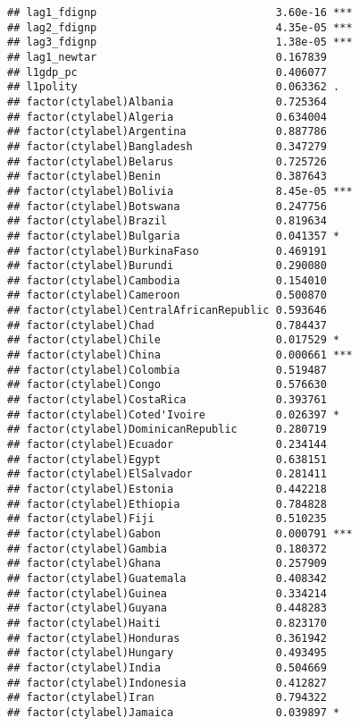 \documentclass[12pt]{article}\usepackage[]{graphicx}\usepackage[]{color}
\makeatletter
\newenvironment{kframe}{%
 \def\at@end@of@kframe{}%
 \ifinner\ifhmode%
  \def\at@end@of@kframe{\end{minipage}}%
  \begin{minipage}{\columnwidth}%
 \fi\fi%
 \def\FrameCommand##1{\hskip\@totalleftmargin \hskip-\fboxsep
 \colorbox{shadecolor}{##1}\hskip-\fboxsep
     \hskip-\linewidth \hskip-\@totalleftmargin \hskip\columnwidth}%
 \MakeFramed {\advance\hsize-\width
   \@totalleftmargin\z@ \linewidth\hsize
   \@setminipage}}%
 {\par\unskip\endMakeFramed%
 \at@end@of@kframe}
\newenvironment{knitrout}{}{} %
\makeatother
\begin{document}
\begin{knitrout}
\begin{kframe}
\begin{verbatim}
## lag1_fdignp                            3.60e-16 ***
## lag2_fdignp                            4.35e-05 ***
## lag3_fdignp                            1.38e-05 ***
## lag1_newtar                            0.167839    
## l1gdp_pc                               0.406077    
## l1polity                               0.063362 .  
## factor(ctylabel)Albania                0.725364    
## factor(ctylabel)Algeria                0.634004    
## factor(ctylabel)Argentina              0.887786    
## factor(ctylabel)Bangladesh             0.347279    
## factor(ctylabel)Belarus                0.725726    
## factor(ctylabel)Benin                  0.387643    
## factor(ctylabel)Bolivia                8.45e-05 ***
## factor(ctylabel)Botswana               0.247756    
## factor(ctylabel)Brazil                 0.819634    
## factor(ctylabel)Bulgaria               0.041357 *  
## factor(ctylabel)BurkinaFaso            0.469191    
## factor(ctylabel)Burundi                0.290080    
## factor(ctylabel)Cambodia               0.154010    
## factor(ctylabel)Cameroon               0.500870    
## factor(ctylabel)CentralAfricanRepublic 0.593646    
## factor(ctylabel)Chad                   0.784437    
## factor(ctylabel)Chile                  0.017529 *  
## factor(ctylabel)China                  0.000661 ***
## factor(ctylabel)Colombia               0.519487    
## factor(ctylabel)Congo                  0.576630    
## factor(ctylabel)CostaRica              0.393761    
## factor(ctylabel)Coted'Ivoire           0.026397 *  
## factor(ctylabel)DominicanRepublic      0.280719    
## factor(ctylabel)Ecuador                0.234144    
## factor(ctylabel)Egypt                  0.638151    
## factor(ctylabel)ElSalvador             0.281411    
## factor(ctylabel)Estonia                0.442218    
## factor(ctylabel)Ethiopia               0.784828    
## factor(ctylabel)Fiji                   0.510235    
## factor(ctylabel)Gabon                  0.000791 ***
## factor(ctylabel)Gambia                 0.180372    
## factor(ctylabel)Ghana                  0.257909    
## factor(ctylabel)Guatemala              0.408342    
## factor(ctylabel)Guinea                 0.334214    
## factor(ctylabel)Guyana                 0.448283    
## factor(ctylabel)Haiti                  0.823170    
## factor(ctylabel)Honduras               0.361942    
## factor(ctylabel)Hungary                0.493495    
## factor(ctylabel)India                  0.504669    
## factor(ctylabel)Indonesia              0.412827    
## factor(ctylabel)Iran                   0.794322    
## factor(ctylabel)Jamaica                0.039897 *  

\end{verbatim}
\end{kframe}
\end{knitrout}
\end{document}
